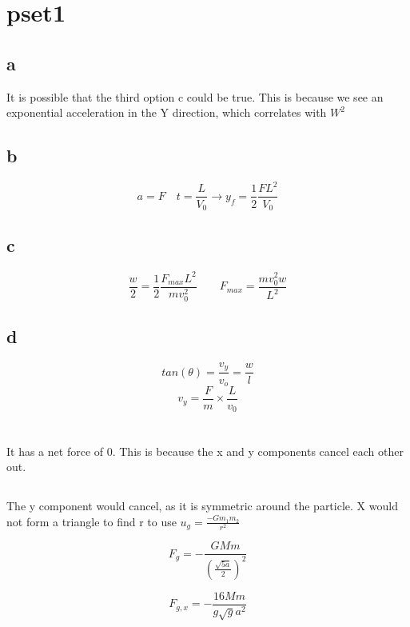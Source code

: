 \section{pset1}

\subsection{a}
    It is possible that the third option c could be true. This is because we see an exponential acceleration in the Y direction, which correlates with \(W^2\)

\subsection{b}
    \[a = F \quad t = \frac{L}{V_0} \rightarrow y_f = \frac{1}{2}\frac{F L^2}{V_0}\]

\subsection{c}
    \[\frac{w}{2} =\frac{1}{2} \frac{F_{max} L^2}{mv_0^2} \qquad F_{max} = \frac{mv_0^2w}{L^2}\]
\subsection{d}
    \[tan(\theta) = \frac{v_y}{v_o} = \frac{w}{l}\]
    \[v_y = 
    \frac{F}{m} \times \frac{L}{v_0}\]
\section{}
\subsection{}
    It has a net force of 0. This is because the x and y components cancel each other out. 
\subsection{}
    The y component would cancel, as it is symmetric around the particle. X would not 
    form a triangle to find r to use \(u_g = \frac{-Gm_1m_2}{r^2}\)

    \[F_g = -\frac{GMm}{{(\frac{\sqrt{5a}}{2})}^2}\]

    \[F_{g,x} = -\frac{16Mm}{g\sqrt{g}a^2}\]


\subsection{}

